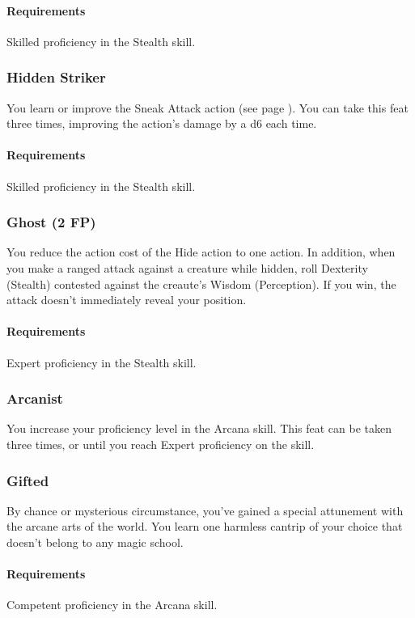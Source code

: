     \paragraph{Requirements} Skilled proficiency in the Stealth skill.
\subsubsection{Hidden Striker} \label{feat::hiddenstriker}
    You learn or improve the Sneak Attack action (see page \pageref{act:sneakattack}).
    You can take this feat three times, improving the action's damage by a d6 each time.
    \paragraph{Requirements} Skilled proficiency in the Stealth skill.
\subsubsection{Ghost (2 FP)} \label{feat::ghost}
    You reduce the action cost of the Hide action to one action.
    In addition, when you make a ranged attack against a creature while hidden, roll Dexterity (Stealth) contested against the creaute's Wisdom (Perception).
    If you win, the attack doesn't immediately reveal your position.
    \paragraph{Requirements} Expert proficiency in the Stealth skill.
\subsubsection{Arcanist} \label{feat::arcanist}
    You increase your proficiency level in the Arcana skill.
    This feat can be taken three times, or until you reach Expert proficiency on the skill.
\subsubsection{Gifted} \label{feat::gifted}
    By chance or mysterious circumstance, you've gained a special attunement with the arcane arts of the world.
    You learn one harmless cantrip of your choice that doesn't belong to any magic school.
    \paragraph{Requirements} Competent proficiency in the Arcana skill.
